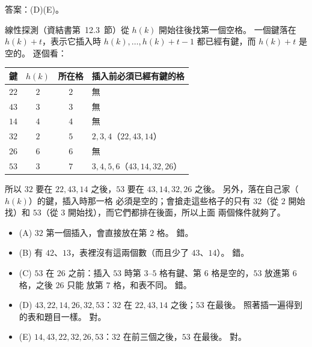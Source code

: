 \begin{pastsoln}
答案：(D)(E)。

線性探測（資結書第~12.3~節）從 $h(k)$ 開始往後找第一個空格。 一個鍵落在 $h(k) + t$，表示它插入時
$h(k), \ldots, h(k) + t - 1$ 都已經有鍵，而 $h(k) + t$ 是空的。 逐個看：
\begin{center}
\small
\begin{tabular}{cccl}
\toprule
鍵 & $h(k)$ & 所在格 & 插入前必須已經有鍵的格 \\
\midrule
$22$ & $2$ & $2$ & 無 \\
$43$ & $3$ & $3$ & 無 \\
$14$ & $4$ & $4$ & 無 \\
$32$ & $2$ & $5$ & $2, 3, 4$（$22, 43, 14$） \\
$26$ & $6$ & $6$ & 無 \\
$53$ & $3$ & $7$ & $3, 4, 5, 6$（$43, 14, 32, 26$） \\
\bottomrule
\end{tabular}
\end{center}
所以 $32$ 要在 $22, 43, 14$ 之後，$53$ 要在 $43, 14, 32, 26$ 之後。 另外，落在自己家（$h(k)$）的鍵，插入時那一格
必須是空的；會搶走這些格子的只有 $32$（從 $2$ 開始找）和 $53$（從 $3$ 開始找），而它們都排在後面，所以上面
兩個條件就夠了。

\begin{itemize}
\item (A) $32$ 第一個插入，會直接放在第 $2$ 格。 錯。
\item (B) 有 $42$、$13$，表裡沒有這兩個數（而且少了 $43$、$14$）。 錯。
\item (C) $53$ 在 $26$ 之前：插入 $53$ 時第 $3$--$5$ 格有鍵、第 $6$ 格是空的，$53$ 放進第 $6$ 格，之後 $26$ 只能
放第 $7$ 格，和表不同。 錯。
\item (D) $43, 22, 14, 26, 32, 53$：$32$ 在 $22, 43, 14$ 之後；$53$ 在最後。 照著插一遍得到的表和題目一樣。 對。
\item (E) $14, 43, 22, 32, 26, 53$：$32$ 在前三個之後，$53$ 在最後。 對。
\end{itemize}
\end{pastsoln}

